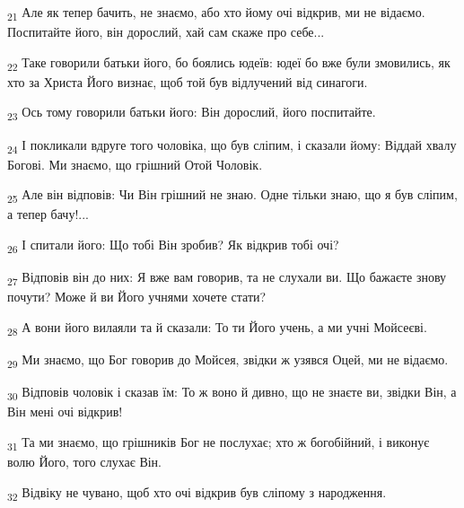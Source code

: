 \begin{tcolorbox}
\textsubscript{21} Але як тепер бачить, не знаємо, або хто йому очі відкрив, ми не відаємо. Поспитайте його, він дорослий, хай сам скаже про себе...
\end{tcolorbox}
\begin{tcolorbox}
\textsubscript{22} Таке говорили батьки його, бо боялись юдеїв: юдеї бо вже були змовились, як хто за Христа Його визнає, щоб той був відлучений від синагоги.
\end{tcolorbox}
\begin{tcolorbox}
\textsubscript{23} Ось тому говорили батьки його: Він дорослий, його поспитайте.
\end{tcolorbox}
\begin{tcolorbox}
\textsubscript{24} І покликали вдруге того чоловіка, що був сліпим, і сказали йому: Віддай хвалу Богові. Ми знаємо, що грішний Отой Чоловік.
\end{tcolorbox}
\begin{tcolorbox}
\textsubscript{25} Але він відповів: Чи Він грішний не знаю. Одне тільки знаю, що я був сліпим, а тепер бачу!...
\end{tcolorbox}
\begin{tcolorbox}
\textsubscript{26} І спитали його: Що тобі Він зробив? Як відкрив тобі очі?
\end{tcolorbox}
\begin{tcolorbox}
\textsubscript{27} Відповів він до них: Я вже вам говорив, та не слухали ви. Що бажаєте знову почути? Може й ви Його учнями хочете стати?
\end{tcolorbox}
\begin{tcolorbox}
\textsubscript{28} А вони його вилаяли та й сказали: То ти Його учень, а ми учні Мойсеєві.
\end{tcolorbox}
\begin{tcolorbox}
\textsubscript{29} Ми знаємо, що Бог говорив до Мойсея, звідки ж узявся Оцей, ми не відаємо.
\end{tcolorbox}
\begin{tcolorbox}
\textsubscript{30} Відповів чоловік і сказав їм: То ж воно й дивно, що не знаєте ви, звідки Він, а Він мені очі відкрив!
\end{tcolorbox}
\begin{tcolorbox}
\textsubscript{31} Та ми знаємо, що грішників Бог не послухає; хто ж богобійний, і виконує волю Його, того слухає Він.
\end{tcolorbox}
\begin{tcolorbox}
\textsubscript{32} Відвіку не чувано, щоб хто очі відкрив був сліпому з народження.
\end{tcolorbox}
